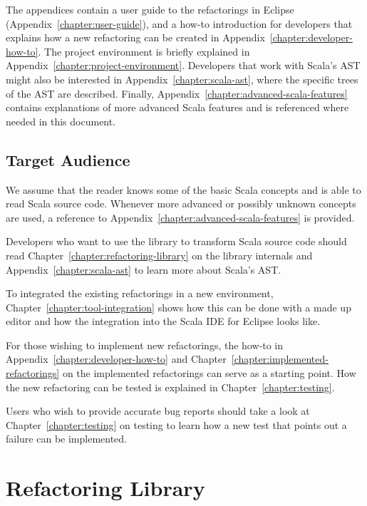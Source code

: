 \documentclass[10pt,a4paper,oneside]{scrreprt}
\begin{document}
The appendices contain a user guide to the refactorings in Eclipse (Appendix~\vref{chapter:user-guide}), and a how-to introduction for developers that explains how a new refactoring can be created in Appendix~\vref{chapter:developer-how-to}. The project environment is briefly explained in Appendix~\vref{chapter:project-environment}. Developers that work with Scala's AST might also be interested in Appendix~\vref{chapter:scala-ast}, where the specific trees of the AST are described. Finally, Appendix~\vref{chapter:advanced-scala-features} contains explanations of more advanced Scala features and is referenced where needed in this document.

\section{Target Audience}

We assume that the reader knows some of the basic Scala concepts and is able to read Scala source code. Whenever more advanced or possibly unknown concepts are used, a reference to Appendix~\vref{chapter:advanced-scala-features} is provided.

Developers who want to use the library to transform Scala source code should read Chapter~\vref{chapter:refactoring-library} on the library internals and Appendix~\vref{chapter:scala-ast} to learn more about Scala's AST. 

To integrated the existing refactorings in a new environment, Chapter~\vref{chapter:tool-integration} shows how this can be done with a made up editor and how the integration into the Scala IDE for Eclipse looks like.

For those wishing to implement new refactorings, the how-to in Appendix~\vref{chapter:developer-how-to} and Chapter~\vref{chapter:implemented-refactorings} on the implemented refactorings can serve as a starting point. How the new refactoring can be tested is explained in Chapter~\vref{chapter:testing}.

Users who wish to provide accurate bug reports should take a look at Chapter~\vref{chapter:testing} on testing to learn how a new test that points out a failure can be implemented.

\chapter{Refactoring Library} \label{chapter:refactoring-library}


\end{document}
